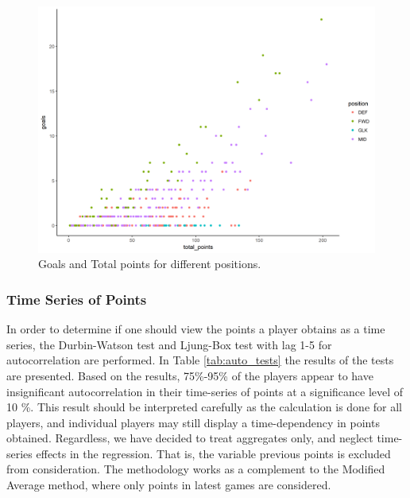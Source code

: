\begin{figure}[H]
    \centering
    \includegraphics[scale=0.55]{fig/chapter_6/goals_tot_poins.png}
    \caption{Goals and Total points for different positions.}
\label{fig:goal_tot_p}    
\end{figure}

\subsubsection{Time Series of Points}

In order to determine if one should view the points a player obtains as a time series, the Durbin-Watson test and Ljung-Box test with lag 1-5 for autocorrelation are performed. In Table \ref{tab:auto_tests} the results of the tests are presented. Based on the results, 75\%-95\% of the players appear to have insignificant autocorrelation in their time-series of points at a significance level of 10 \%. This result should be interpreted carefully as the calculation is done for all players, and individual players may still display a time-dependency in points obtained. Regardless, we have decided to treat aggregates only, and neglect time-series effects in the regression. That is, the variable previous points is excluded from consideration. The methodology works as a complement to the Modified Average method, where only points in latest games are considered.

